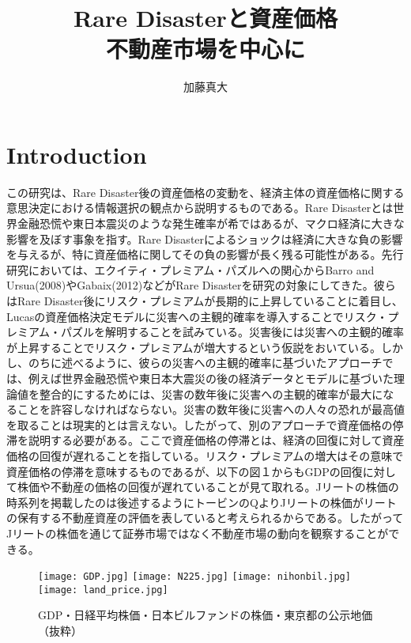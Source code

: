 \documentclass{jsarticle}
\begin{document}
\title{%
  Rare Disasterと資産価格 \\
  \large 不動産市場を中心に}
\author{加藤真大}
\maketitle

\section{Introduction}
この研究は、Rare Disaster後の資産価格の変動を、経済主体の資産価格に関する意思決定における情報選択の観点から説明するものである。Rare Disasterとは世界金融恐慌や東日本震災のような発生確率が希ではあるが、マクロ経済に大きな影響を及ぼす事象を指す。Rare Disasterによるショックは経済に大きな負の影響を与えるが、特に資産価格に関してその負の影響が長く残る可能性がある。先行研究においては、エクイティ・プレミアム・パズルへの関心からBarro and Ursua(2008)やGabaix(2012)などがRare Disasterを研究の対象にしてきた。彼らはRare Disaster後にリスク・プレミアムが長期的に上昇していることに着目し、Lucasの資産価格決定モデルに災害への主観的確率を導入することでリスク・プレミアム・パズルを解明することを試みている。災害後には災害への主観的確率が上昇することでリスク・プレミアムが増大するという仮説をおいている。しかし、のちに述べるように、彼らの災害への主観的確率に基づいたアプローチでは、例えば世界金融恐慌や東日本大震災の後の経済データとモデルに基づいた理論値を整合的にするためには、災害の数年後に災害への主観的確率が最大になることを許容しなければならない。災害の数年後に災害への人々の恐れが最高値を取ることは現実的とは言えない。したがって、別のアプローチで資産価格の停滞を説明する必要がある。ここで資産価格の停滞とは、経済の回復に対して資産価格の回復が遅れることを指している。リスク・プレミアムの増大はその意味で資産価格の停滞を意味するものであるが、以下の図１からもGDPの回復に対して株価や不動産の価格の回復が遅れていることが見て取れる。Jリートの株価の時系列を掲載したのは後述するようにトービンのQよりJリートの株価がリートの保有する不動産資産の評価を表していると考えられるからである。したがってJリートの株価を通じて証券市場ではなく不動産市場の動向を観察することができる。

\begin{figure}
\centering
\texttt{[image: GDP.jpg]}
\texttt{[image: N225.jpg]}
\texttt{[image: nihonbil.jpg]}
\texttt{[image: land\_price.jpg]}
\caption{GDP・日経平均株価・日本ビルファンドの株価・東京都の公示地価（抜粋）}
\end{figure}
\end{document}
